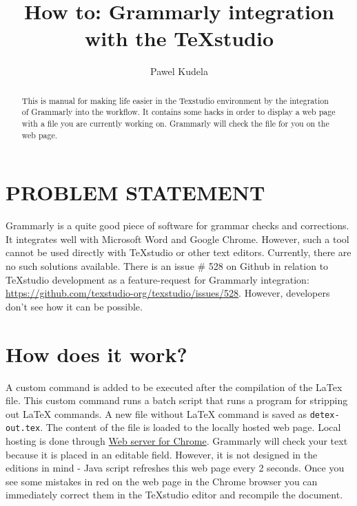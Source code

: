 \documentclass[]{spie}  %
\title{How to: Grammarly integration with the TeXstudio}
\author[a]{Pawel Kudela}
\affil[a]{Institute of Fluid-Flow Machinery, Polish Academy of Sciences, Fiszera 14 St, 80-231 Gdansk, Poland}
\begin{document}
 
\maketitle

\begin{abstract}
This is manual for making life easier in the Texstudio environment by the integration of Grammarly into the workflow. 
It contains some hacks in order to display a web page with a file you are currently working on. 
Grammarly will check the file for you on the web page. 
\end{abstract}


\section{PROBLEM STATEMENT}
\label{sec:intro}  %
Grammarly is a quite good piece of software for grammar checks and corrections. 
It integrates well with Microsoft Word and Google Chrome. 
However, such a tool cannot be used directly with TeXstudio or other text editors. Currently, there are no such solutions available. 
There is an issue \# 528 on Github in relation to TeXstudio development as a feature-request for Grammarly integration: \url{https://github.com/texstudio-org/texstudio/issues/528}.
However, developers don't see how it can be possible.

\section{How does it work?}

A custom command is added to be executed after the compilation of the LaTex file.
This custom command runs a batch script that runs a program for stripping out LaTeX commands. A new file without LaTeX command is saved as \verb|detex-out.tex|. 
The content of the file is loaded to the locally hosted web page. 
Local hosting is done through \href{https://chrome.google.com/webstore/detail/web-server-for-chrome/ofhbbkphhbklhfoeikjpcbhemlocgigb}{Web server for Chrome}. Grammarly will check your text because it is placed in an editable field. 
However, it is not designed in the editions in mind - Java script refreshes this web page every 2 seconds. 
Once you see some mistakes in red on the web page in the Chrome browser you can immediately correct them in the TeXstudio editor and recompile the document. 
\end{document}
